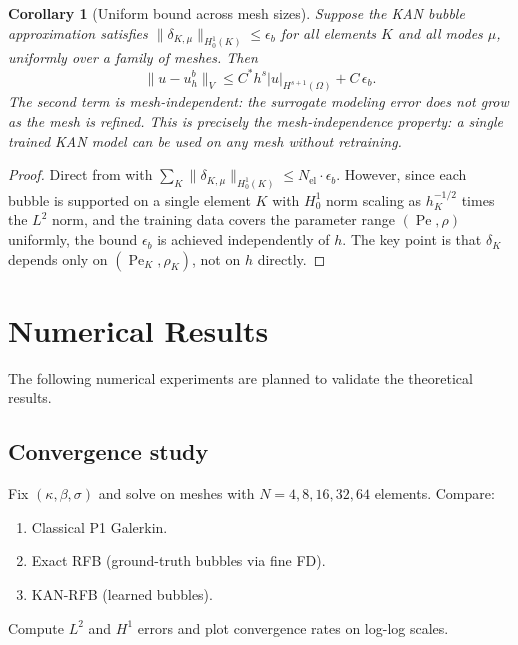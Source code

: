 \documentclass[11pt]{article}
\newcommand{\dom}{\Omega}
\newcommand{\Pe}{\operatorname{Pe}}
\newtheorem{corollary}[theorem]{Corollary}
\theoremstyle{remark}
\begin{document}
\begin{corollary}[Uniform bound across mesh sizes]
\label{cor:mesh_independence}
Suppose the KAN bubble approximation satisfies $\|\delta_{K,\mu}\|_{H^1_0(K)} \leq \epsilon_b$ for all elements $K$ and all modes $\mu$, uniformly over a family of meshes. Then
\begin{equation}
\|u - u_h^b\|_V \leq C^* h^s |u|_{H^{s+1}(\dom)} + C\,\epsilon_b.
\end{equation}
The second term is mesh-independent: the surrogate modeling error does not grow as the mesh is refined. This is precisely the mesh-independence property: a single trained KAN model can be used on any mesh without retraining.
\end{corollary}

\begin{proof}
Direct from  with $\sum_K \|\delta_{K,\mu}\|_{H^1_0(K)} \leq N_{\mathrm{el}} \cdot \epsilon_b$. However, since each bubble is supported on a single element $K$ with $H^1_0$ norm scaling as $h_K^{-1/2}$ times the $L^2$ norm, and the training data covers the parameter range $(\Pe, \rho)$ uniformly, the bound $\epsilon_b$ is achieved independently of $h$. The key point is that $\delta_K$ depends only on $(\Pe_K, \rho_K)$, not on $h$ directly.
\end{proof}

\section{Numerical Results}
\label{sec:numerics}

The following numerical experiments are planned to validate the theoretical results.

\subsection{Convergence study}
Fix $(\kappa, \beta, \sigma)$ and solve on meshes with $N = 4, 8, 16, 32, 64$ elements. Compare:
\begin{enumerate}[nosep]
    \item Classical P1 Galerkin.
    \item Exact RFB (ground-truth bubbles via fine FD).
    \item KAN-RFB (learned bubbles).
\end{enumerate}
Compute $L^2$ and $H^1$ errors and plot convergence rates on log-log scales.
\end{document}
